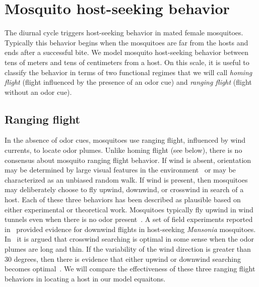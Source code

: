 \documentclass[12pt]{article}
\newif\ifcommentsw
\newcommand{\comment}[1]{\ifcommentsw  $\blacktriangleright$\ \textbf{#1}\ $\blacktriangleleft$ \fi}
\begin{document}
\section{Mosquito host-seeking behavior}\label{sec:mosqbehav}
The diurnal cycle triggers host-seeking behavior in mated female mosquitoes. \comment{citation} Typically this behavior begins when the mosquitoes are far from the hosts and ends after a successful bite.  We model mosquito host-seeking behavior between tens of meters and tens of centimeters from a host. On this scale, it is useful to classify the behavior in terms of two functional regimes that we will call  {\em homing flight} (flight influenced by the presence of an odor cue) and {\em ranging flight} (flight without an odor cue).

\subsection{Ranging flight}
In the absence of odor cues, mosquitoes use ranging flight, influenced by wind currents, to locate odor plumes.  Unlike homing flight (see below), there is no consensus about mosquito ranging flight behavior. If wind is absent, orientation may be determined by large visual features in the
environment~\cite{Bidlingmayer1994} or may be characterized as an unbiased random walk. If wind is present, then mosquitoes may deliberately choose to fly upwind, downwind, or crosswind in search of a host.  Each of these three behaviors has been described as plausible based on either experimental or theoretical work.
Mosquitoes typically fly upwind in wind tunnels even when there is no odor present~\cite{Gibson1999}.
A set of field experiments reported in~\cite{Gillies1974} provided evidence for downwind flights in host-seeking
 \emph{Mansonia} mosquitoes.
In~\cite{Dusenbery1989} it is argued that crosswind searching is optimal in some sense when the odor plumes are long and thin.  If the variability of the wind direction is greater than 30 degrees, then there is evidence that either upwind or downwind searching becomes optimal~\cite{Sabelis1984}.  We will compare the effectiveness of these three ranging flight behaviors in locating a host in our model equaitons.

\end{document}
